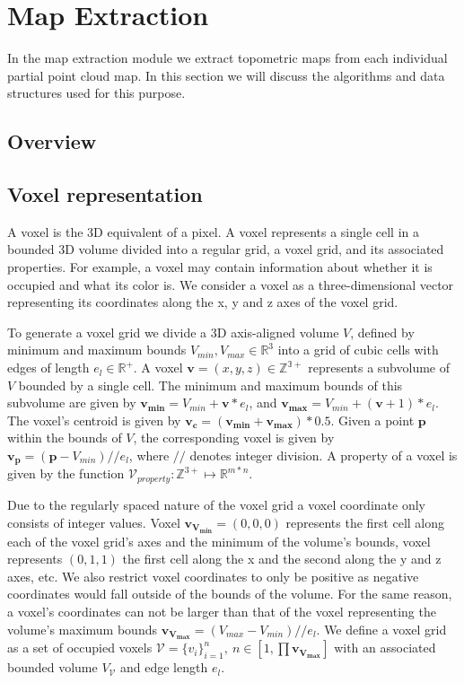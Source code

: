\documentclass{article}
\begin{document}
\section{Map Extraction}
In the map extraction module we extract topometric maps from each individual partial point cloud map. In this section we will discuss the algorithms and data structures used for this purpose.

\subsection{Overview}

\subsection{Voxel representation}
A voxel is the 3D equivalent of a pixel. A voxel represents a single cell in a bounded 3D volume divided into a regular grid, a voxel grid, and its associated properties. For example, a voxel may contain information about whether it is occupied and what its color is. We consider a voxel as a three-dimensional vector representing its coordinates along the x, y and z axes of the voxel grid. 

To generate a voxel grid we divide a 3D axis-aligned volume \(V\), defined by minimum and maximum bounds \(V_{min}, V_{max} \in \mathbb{R}^{3}\) into a grid of cubic cells with edges of length \(e_{l} \in \mathbb{R}^+\). A voxel $\boldsymbol{v} = (x, y, z) \in \mathbb{Z^{3+}}$ represents a subvolume of \(V\) bounded by a single cell. The minimum and maximum bounds of this subvolume are given by \(\boldsymbol{v_{min}} = V_{min} + \boldsymbol{v}*e_{l}\), and \(\boldsymbol{v_{max}} = V_{min} + (\boldsymbol{v}+1)*e_{l}\). The voxel's centroid is given by \(\boldsymbol{v_c} = (\boldsymbol{v_{min}} + \boldsymbol{v_{max}})*0.5\). Given a point \(\boldsymbol{p}\) within the bounds of \(V\), the corresponding voxel is given by \(\boldsymbol{v_p} = (\boldsymbol{p} - V_{min})//e_l\), where \(//\) denotes integer division. A property of a voxel is given by the function \(\mathcal{V}_{property}: \mathbb{Z}^{3+} \mapsto \mathbb{R}^{m*n}\).

Due to the regularly spaced nature of the voxel grid a voxel coordinate only consists of integer values. Voxel \(\boldsymbol{v_{V_{min}}} = (0,0,0)\) represents the first cell along each of the voxel grid's axes and the minimum of the volume's bounds, voxel represents \((0,1,1)\) the first cell along the x and the second along the y and z axes, etc. We also restrict voxel coordinates to only be positive as negative coordinates would fall outside of the bounds of the volume. For the same reason, a voxel's coordinates can not be larger than that of the voxel representing the volume's maximum bounds \(\boldsymbol{v_{V_{max}}} = (V_{max} - V_{min})//e_l\). We define a voxel grid as a set of occupied voxels \(\mathcal{V}=\{v_{i}\}_{i=1}^{n},\ n \in [1, \prod{\boldsymbol{v_{V_{max}}}}]\) with an associated bounded volume \(V_{\mathcal{V}}\) and edge length \(e_{l}\).
\end{document}
